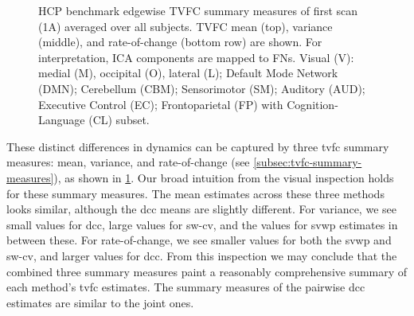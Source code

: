 \begin{figure}[t]
  \caption{
    HCP benchmark edgewise TVFC summary measures of first scan (1A) averaged over all subjects.
    TVFC mean (top), variance (middle), and rate-of-change (bottom row) are shown.
    For interpretation, ICA components are mapped to FNs.
    Visual (V): medial (M), occipital (O), lateral (L); Default Mode Network (DMN); Cerebellum (CBM); Sensorimotor (SM); Auditory (AUD); Executive Control (EC); Frontoparietal (FP) with Cognition-Language (CL) subset.
  }\label{fig:HCP-model-estimates-summary-measures}
\end{figure}


These distinct differences in dynamics can be captured by three \gls{tvfc} summary measures: mean, variance, and rate-of-change (see \cref{subsec:tvfc-summary-measures}), as shown in \cref{fig:HCP-model-estimates-summary-measures}.
Our broad intuition from the visual inspection holds for these summary measures.
%
The mean estimates across these three methods looks similar, although the \gls{dcc} means are slightly different.
%
For variance, we see small values for \gls{dcc}, large values for \gls{sw-cv}, and the values for \gls{svwp} estimates in between these.
%
For rate-of-change, we see smaller values for both the \gls{svwp} and \gls{sw-cv}, and larger values for \gls{dcc}.
%
From this inspection we may conclude that the combined three summary measures paint a reasonably comprehensive summary of each method's \gls{tvfc} estimates.
The summary measures of the pairwise \gls{dcc} estimates are similar to the joint ones.


